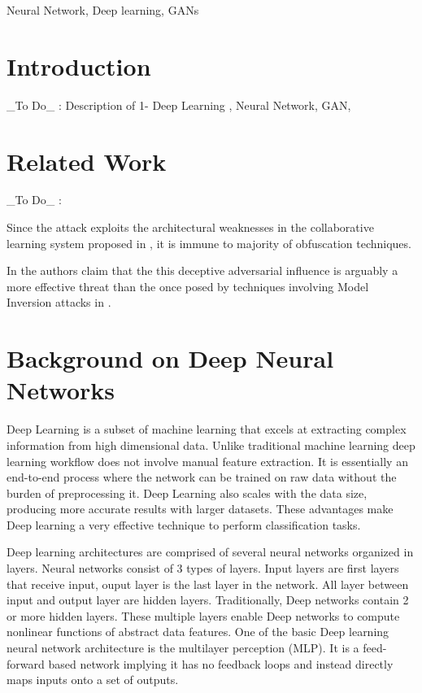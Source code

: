 \documentclass[conference]{IEEEtran}
\begin{document}
\begin{IEEEkeywords}
Neural Network, Deep learning, GANs
\end{IEEEkeywords}

\section{Introduction}
\_To Do\_ : Description of 1- Deep Learning , Neural Network, GAN,

\section{Related Work}
\_To Do\_ :

Since the attack \cite{hitaj2017deep} exploits the architectural weaknesses in the collaborative learning system proposed in \cite{abadi2016deep}, 
it is
immune to majority of obfuscation techniques. 

In \cite{hitaj2017deep} the authors claim that the this deceptive adversarial influence is arguably a more
effective threat than the once posed by techniques involving Model Inversion attacks in \cite{deng2012mnist}.

\section{Background on Deep Neural Networks}
Deep Learning  is a subset of machine learning that excels at extracting complex information from high dimensional data. Unlike traditional machine learning deep learning workflow does not involve manual feature extraction. It is essentially an end-to-end process where the network can be trained on raw data without the burden of preprocessing it.
Deep Learning also scales with the data size, producing more accurate results with larger datasets.
These advantages make Deep learning a very effective technique to perform classification tasks.

Deep learning architectures are comprised of several neural networks organized in layers. Neural networks consist of 3 types of layers. Input layers are first layers that receive input, ouput layer is the last layer in the network. All layer between input and output layer are hidden layers. Traditionally, Deep networks contain 2 or more hidden layers. These multiple layers enable Deep networks to compute nonlinear functions of abstract data features.
One of the basic Deep learning neural network architecture is the multilayer perception (MLP). It is a feed-forward based network implying it has no feedback loops and instead directly maps inputs onto a set of outputs. 
\end{document}
